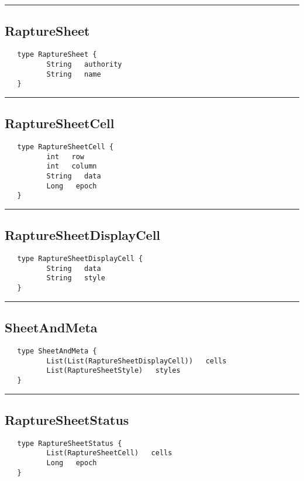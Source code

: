 \rule{15cm}{2pt}
\subsection{RaptureSheet}
\label{type:RaptureSheet}

\begin{verbatim}
   type RaptureSheet {
          String   authority
          String   name
   }
\end{verbatim}

\rule{15cm}{2pt}
\subsection{RaptureSheetCell}
\label{type:RaptureSheetCell}

\begin{verbatim}
   type RaptureSheetCell {
          int   row
          int   column
          String   data
          Long   epoch
   }
\end{verbatim}

\rule{15cm}{2pt}
\subsection{RaptureSheetDisplayCell}
\label{type:RaptureSheetDisplayCell}

\begin{verbatim}
   type RaptureSheetDisplayCell {
          String   data
          String   style
   }
\end{verbatim}

\rule{15cm}{2pt}
\subsection{SheetAndMeta}
\label{type:SheetAndMeta}

\begin{verbatim}
   type SheetAndMeta {
          List(List(RaptureSheetDisplayCell))   cells
          List(RaptureSheetStyle)   styles
   }
\end{verbatim}

\rule{15cm}{2pt}
\subsection{RaptureSheetStatus}
\label{type:RaptureSheetStatus}

\begin{verbatim}
   type RaptureSheetStatus {
          List(RaptureSheetCell)   cells
          Long   epoch
   }
\end{verbatim}

